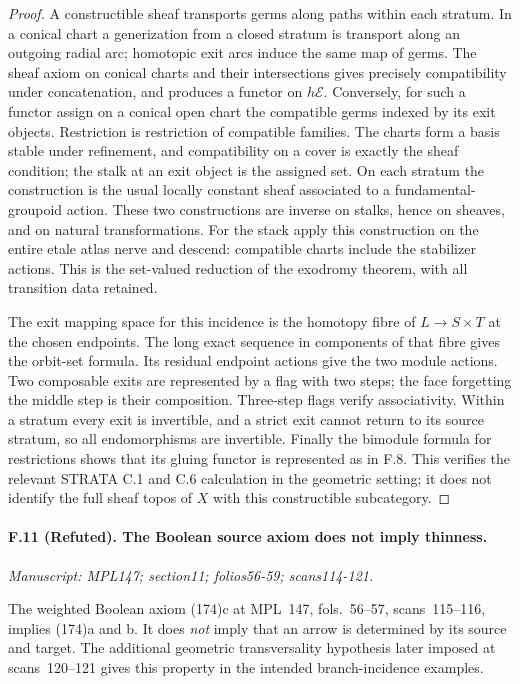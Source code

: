 \begin{proof}
A constructible sheaf transports germs along paths within each stratum.
In a conical chart a generization from a closed stratum is transport along
an outgoing radial arc; homotopic exit arcs induce the same map of germs.
The sheaf axiom on conical charts and their intersections gives precisely
compatibility under concatenation, and produces a functor on
$h\mathcal E$. Conversely, for such a functor assign on a conical open
chart the compatible germs indexed by its exit objects. Restriction is
restriction of compatible families. The charts form a basis stable under
refinement, and compatibility on a cover is exactly the sheaf condition;
the stalk at an exit object is the assigned set. On each stratum the
construction is the usual locally constant sheaf associated to a
fundamental-groupoid action. These two constructions are inverse on
stalks, hence on sheaves, and on natural transformations. For the stack
apply this construction on the entire etale atlas nerve and descend:
compatible charts include the stabilizer actions. This is the
set-valued reduction of the exodromy theorem, with all transition data
retained.

The exit mapping space for this incidence is the homotopy fibre of
$L\to S\times T$ at the chosen endpoints. The long exact sequence in
components of that fibre gives the orbit-set formula. Its residual
endpoint actions give the two module actions. Two composable exits are
represented by a flag with two steps; the face forgetting the middle
step is their composition. Three-step flags verify associativity. Within
a stratum every exit is invertible, and a strict exit cannot return to its
source stratum, so all endomorphisms are invertible. Finally the bimodule
formula for restrictions shows that its gluing functor is represented as
in F.8. This verifies the relevant STRATA C.1 and C.6 calculation in the
geometric setting; it does not identify the full sheaf topos of $X$ with
this constructible subcategory.
\end{proof}

\paragraph{F.11 (Refuted). The Boolean source axiom does not imply thinness.}
\textit{Manuscript: MPL147; section11; folios56-59; scans114-121.}

The weighted Boolean axiom (174)c at MPL~147, fols.~56--57,
scans~115--116, implies (174)a and b. It does \emph{not} imply that an
arrow is determined by its source and target. The additional geometric
transversality hypothesis later imposed at scans~120--121 gives this
property in the intended branch-incidence examples.

